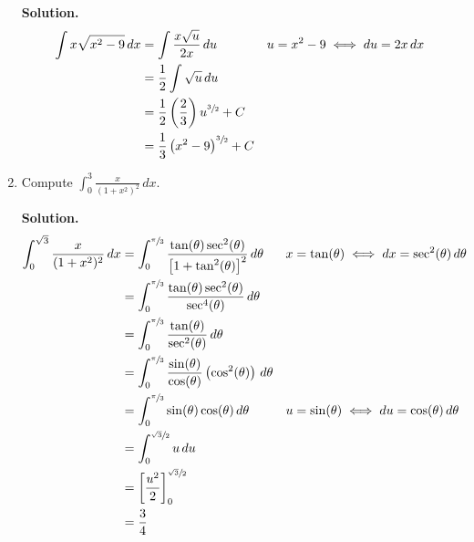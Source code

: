 \begin{Example}{}{}
\begin{enumerate}[label=(\roman*)]
              \textbf{Solution.}
              \begin{align*}
                  \int x\sqrt{x^2-9}\, d{x}
                   & =\int \frac{x\sqrt{u}}{2x} \, d{u}                         &  & u=x^2-9\iff du=2x\,dx \\
                   & =\frac{1}{2} \int \sqrt{u}\, d{u}                                                     \\
                   & =\frac{1}{2} \left( \frac{2}{3} \right) u^{\sfrac{3}{2}}+C                            \\
                   & =\frac{1}{3}\left( x^2-9 \right)^{\sfrac{3}{2}}+C
              \end{align*}
        \item Compute $ \displaystyle  \int_{0}^{3} \frac{x}{(1+x^2)^2} \, d{x} $.

              \textbf{Solution.}
              \begin{align*}
                  \int_{0}^{\sqrt{3}} \frac{x}{(1+x^2)^2} \, d{x}
                   & =\int_{0}^{\sfrac{\pi}{3}}
                  \frac{\tan(\theta)\sec^2(\theta)}{\left[ 1+\tan^2(\theta) \right]^2} \, d{\theta}
                   &                                                                                                        & x=\tan(\theta)\iff dx=\sec^2(\theta)\,d\theta                                               \\
                   & =\int_{0}^{\sfrac{\pi}{3}} \frac{\tan(\theta)\sec^2(\theta)}{\sec^4(\theta)} \, d{\theta}                                                                                                            \\
                   & =\int_{0}^{\sfrac{\pi}{3}} \frac{\tan(\theta)}{\sec^2(\theta)} \, d{\theta}                                                                                                                          \\
                   & =\int_{0}^{\sfrac{\pi}{3}} \frac{\sin(\theta)}{\cos(\theta)} \left( \cos^2(\theta) \right)\, d{\theta}                                                                                               \\
                   & =\int_{0}^{\sfrac{\pi}{3}}\sin(\theta)\cos(\theta)\, d{\theta}                                         &                                               & u=\sin(\theta)\iff du=\cos(\theta)\,d\theta \\
                   & =\int_{0}^{\sfrac{\sqrt{3}}{2}} u\, d{u}                                                                                                                                                             \\
                   & =\left[\frac{u^2}{2} \right]^{\sfrac{\sqrt{3}}{2}}_0                                                                                                                                                 \\
                   & =\frac{3}{4}
              \end{align*}
    \end{enumerate}
\end{Example}
